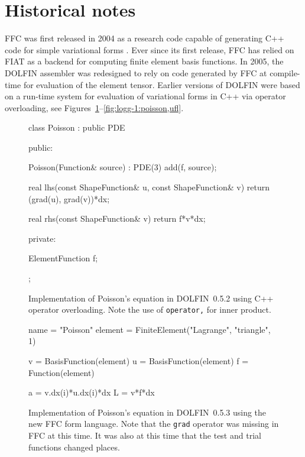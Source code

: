 \section{Historical notes}

FFC was first released in 2004 as a research code capable of
generating C++ code for simple variational forms
\citep{KirbyLogg2006,KirbyLogg2007}. Ever since its first release,
FFC has relied on FIAT as a backend for computing finite element basis
functions. In 2005, the DOLFIN assembler was redesigned to rely on
code generated by FFC at compile-time for evaluation of the element
tensor. Earlier versions of DOLFIN were based on a run-time system for
evaluation of variational forms in C++ via operator overloading, see
Figures~\ref{fig:logg-1:poisson,before}--\ref{fig:logg-1:poisson,ufl}.

\begin{figure}
\begin{c++}
class Poisson : public PDE
{
public:

  Poisson(Function& source) : PDE(3)
  {
    add(f, source);
  }

  real lhs(const ShapeFunction& u,
           const ShapeFunction& v)
  {
    return (grad(u), grad(v))*dx;
  }

  real rhs(const ShapeFunction& v)
  {
    return f*v*dx;
  }

private:

  ElementFunction f;

};
\end{c++}
  \caption{Implementation of Poisson's equation in DOLFIN~0.5.2 using C++ operator overloading.
           Note the use of \texttt{operator,} for inner product.}
  \label{fig:logg-1:poisson,before}
\end{figure}

\begin{figure}
\begin{python}
name = "Poisson"
element = FiniteElement("Lagrange", "triangle", 1)

v = BasisFunction(element)
u = BasisFunction(element)
f = Function(element)

a = v.dx(i)*u.dx(i)*dx
L = v*f*dx
\end{python}
\caption{Implementation of Poisson's equation in DOLFIN~0.5.3 using
  the new FFC form language. Note that the \texttt{grad} operator
  was missing in FFC at this time. It was also at this time that the
  test and trial functions changed places.}
\label{fig:logg-1:poisson,after}
\end{figure}

